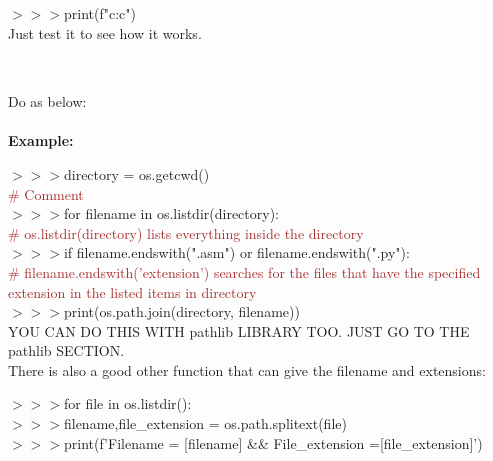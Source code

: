 \documentclass[a4paper,18pt]{article}
\begin{document}
$>>>$\hspace*{28pt}print(f"c:{c}")\\

Just test it to see how it works.\\\\




\subsection{\colorbox {matgreen}{\color{white}{\large To Loop over files in a directory}}}
Do as below:\\\\
\textbf{Example:\\}

$>>>$directory = os.getcwd()\\{\textcolor{brown}{\# Comment}}\\

$>>>$for filename in os.listdir(directory):\\{\textcolor{brown}{\# os.listdir(directory) lists everything inside the directory}}\\

$>>>$\hspace*{28pt}if filename.endswith(".asm") or filename.endswith(".py"):\\{\textcolor{brown}{\# filename.endswith('extension') searches for the files that have the specified extension in the listed items in directory}}\\

$>>>$\hspace*{42pt}print(os.path.join(directory, filename))\\

YOU CAN DO THIS WITH pathlib LIBRARY TOO. JUST GO TO THE pathlib SECTION.\\

There is also a good other function that can give the filename and extensions:

$>>>$for file in os.listdir():\\

$>>>$\hspace*{28pt}filename,file\_extension = os.path.splitext(file)\\

$>>>$\hspace*{28pt}print(f'Filename = {[filename]} \&\& File\_extension ={[file\_extension]}')\\\\
\end{document}
